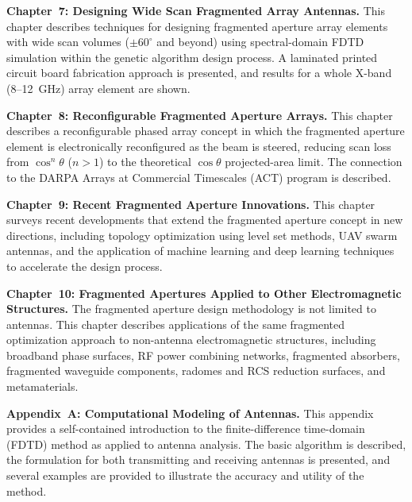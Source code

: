 \textbf{Chapter~7: Designing Wide Scan Fragmented Array Antennas.}  This chapter describes techniques for designing fragmented aperture array elements with wide scan volumes ($\pm 60^{\circ}$ and beyond) using spectral-domain FDTD simulation within the genetic algorithm design process.  A laminated printed circuit board fabrication approach is presented, and results for a whole X-band (8--12~GHz) array element are shown.

\textbf{Chapter~8: Reconfigurable Fragmented Aperture Arrays.}  This chapter describes a reconfigurable phased array concept in which the fragmented aperture element is electronically reconfigured as the beam is steered, reducing scan loss from $\cos^n\theta$ ($n > 1$) to the theoretical $\cos\theta$ projected-area limit.  The connection to the DARPA Arrays at Commercial Timescales (ACT) program is described.

\textbf{Chapter~9: Recent Fragmented Aperture Innovations.}  This chapter surveys recent developments that extend the fragmented aperture concept in new directions, including topology optimization using level set methods, UAV swarm antennas, and the application of machine learning and deep learning techniques to accelerate the design process.

\textbf{Chapter~10: Fragmented Apertures Applied to Other Electromagnetic Structures.}  The fragmented aperture design methodology is not limited to antennas.  This chapter describes applications of the same fragmented optimization approach to non-antenna electromagnetic structures, including broadband phase surfaces, RF power combining networks, fragmented absorbers, fragmented waveguide components, radomes and RCS reduction surfaces, and metamaterials.

\textbf{Appendix~A: Computational Modeling of Antennas.}  This appendix provides a self-contained introduction to the finite-difference time-domain (FDTD) method as applied to antenna analysis.  The basic algorithm is described, the formulation for both transmitting and receiving antennas is presented, and several examples are provided to illustrate the accuracy and utility of the method.







